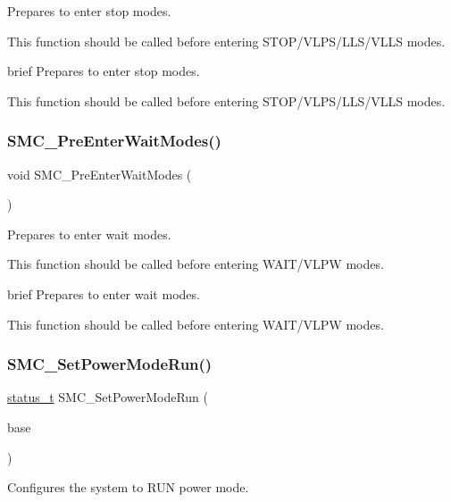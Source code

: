 Prepares to enter stop modes. 

This function should be called before entering S\+T\+O\+P/\+V\+L\+P\+S/\+L\+L\+S/\+V\+L\+LS modes.

brief Prepares to enter stop modes.

This function should be called before entering S\+T\+O\+P/\+V\+L\+P\+S/\+L\+L\+S/\+V\+L\+LS modes. \mbox{\label{group__smc_ga3e21b9caeb6f72076f1ba5fa839c4410}} 
\subsubsection{\texorpdfstring{SMC\_PreEnterWaitModes()}{SMC\_PreEnterWaitModes()}}
{\footnotesize\ttfamily void S\+M\+C\+\_\+\+Pre\+Enter\+Wait\+Modes (\begin{DoxyParamCaption}\item[{void}]{ }\end{DoxyParamCaption})}



Prepares to enter wait modes. 

This function should be called before entering W\+A\+I\+T/\+V\+L\+PW modes.

brief Prepares to enter wait modes.

This function should be called before entering W\+A\+I\+T/\+V\+L\+PW modes. \mbox{\label{group__smc_ga8f141beaa4867a3d1606b714e63c30c3}} 
\subsubsection{\texorpdfstring{SMC\_SetPowerModeRun()}{SMC\_SetPowerModeRun()}}
{\footnotesize\ttfamily \mbox{\hyperlink{group__ksdk__common_gaaabdaf7ee58ca7269bd4bf24efcde092}{status\+\_\+t}} S\+M\+C\+\_\+\+Set\+Power\+Mode\+Run (\begin{DoxyParamCaption}\item[{\mbox{\hyperlink{struct_s_m_c___type}{S\+M\+C\+\_\+\+Type}} $\ast$}]{base }\end{DoxyParamCaption})}



Configures the system to R\+UN power mode. 


